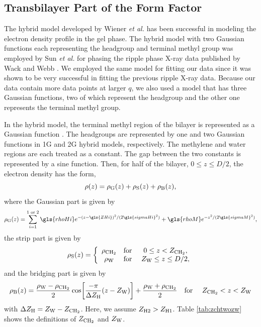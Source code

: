 \subsection{Transbilayer Part of the Form Factor}\label{sec:transbilayer}
The hybrid model developed by Wiener \textit{et al.} \cite{ref:Wiener89} has
been successful in modeling the electron density profile in the gel phase.
The hybrid model with two Gaussian functions each representing the headgroup and
terminal methyl group was employed by Sun 
\textit{et al.} \cite{ref:Sun96}
for phasing the ripple phase X-ray data published by Wack and Webb \cite{ref:Wack89}.
We employed the same model for fitting our data 
since it was shown to be very successful in fitting the previous ripple X-ray data.
Because our data contain more data points at larger $q$, we also used
a model that has three  Gaussian functions, two of which represent the headgroup 
and the other one represents the terminal methyl group. 

In the hybrid model, the terminal methyl region of the bilayer is represented
as a Gaussian function \cite{ref:Wiener89}. The headgroups are represented by one 
and two Gaussian
functions in 1G and 2G hybrid models, respectively. The methylene and water 
regions are each treated as a constant. The gap between the two constants is 
represented by a sine function. Then, for half of the bilayer, 
$0 \leq z \leq D/2$, the electron density has the form, 
\begin{equation}
  \rho(z) = \rho_\mathrm{G}(z) + \rho_\mathrm{S}(z) + \rho_\mathrm{B}(z),
\end{equation}
where the Gaussian part is given by 
\begin{equation}
  \rhog(z) = \sum_{i=1}^{1\text{ or }2} \gls{rhoHi}
             e^{-(z-\gls{ZHi})^2/(2\gls{sigmaHi}^2)} + \gls{rhoM} e^{-z^2/(2\gls{sigmaM}^2)},
\end{equation}
the strip part is given by
\begin{equation}
  \rho_\mathrm{S}(z) = \left\{
    \begin{array}{ccc}
      \rho_\mathrm{CH_2} & \text{for } & 0 \leq z < Z_\mathrm{CH_2}, \\
      \rho_\mathrm{W}   & \text{for } & Z_\mathrm{W} \leq z \leq D/2,
    \end{array}
  \right.
\end{equation}
and the bridging part is given by
\begin{equation}
  \rho_\mathrm{B}(z) = \frac{\rho_\mathrm{W}-\rho_\mathrm{CH_2}}{2} \cos \mathopen{}\left[ 
    \frac{-\pi}{\Delta Z_\mathrm{H}}(z-Z_\mathrm{W}) \right]\mathclose{} + \frac{\rho_\mathrm{W}+\rho_\mathrm{CH_2}}{2} \\
  \text{\quad for \quad} Z_\mathrm{CH_2} < z < Z_\mathrm{W}
\end{equation}
with $\Delta Z_\mathrm{H}=Z_\mathrm{W}-Z_\mathrm{CH_2}$. Here, we assume $Z_{\mathrm{H}2}>Z_{\mathrm{H}1}$. 
Table \ref{tab:zchtwozw} shows the definitions of $Z_\mathrm{CH_2}$ and $Z_\mathrm{W}$.

